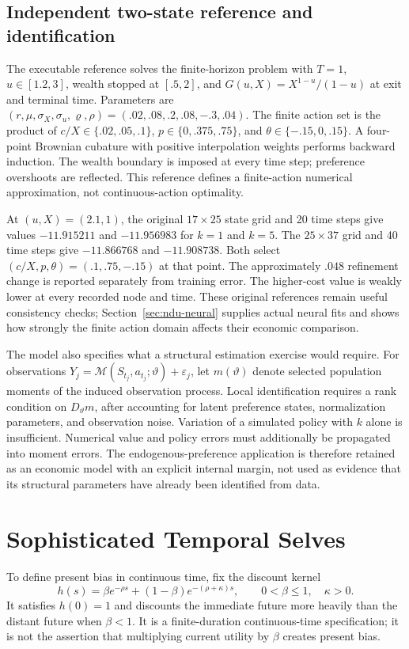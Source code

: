\documentclass[ecta,draft]{econsocart}
\theoremstyle{definition}
\theoremstyle{remark}
\begin{document}
\subsection{Independent two-state reference and identification}
The executable reference solves the finite-horizon problem with $T=1$, $u\in[1.2,3]$, wealth stopped at $[.5,2]$, and $G(u,X)=X^{1-u}/(1-u)$ at exit and terminal time. Parameters are $(r,\mu,\sigma_X,\sigma_u,\varrho,\rho)=(.02,.08,.2,.08,-.3,.04)$. The finite action set is the product of $c/X\in\{.02,.05,.1\}$, $p\in\{0,.375,.75\}$, and $\theta\in\{-.15,0,.15\}$. A four-point Brownian cubature with positive interpolation weights performs backward induction. The wealth boundary is imposed at every time step; preference overshoots are reflected. This reference defines a finite-action numerical approximation, not continuous-action optimality.

At $(u,X)=(2.1,1)$, the original $17\times25$ state grid and 20 time steps give values $-11.915211$ and $-11.956983$ for $k=1$ and $k=5$. The $25\times37$ grid and 40 time steps give $-11.866768$ and $-11.908738$. Both select $(c/X,p,\theta)=(.1,.75,-.15)$ at that point. The approximately $.048$ refinement change is reported separately from training error. The higher-cost value is weakly lower at every recorded node and time. These original references remain useful consistency checks; Section~\ref{sec:ndu-neural} supplies actual neural fits and shows how strongly the finite action domain affects their economic comparison.

The model also specifies what a structural estimation exercise would require. For observations $Y_j=\mathcal M(S_{t_j},a_{t_j};\vartheta)+\varepsilon_j$, let $m(\vartheta)$ denote selected population moments of the induced observation process. Local identification requires a rank condition on $D_\vartheta m$, after accounting for latent preference states, normalization parameters, and observation noise. Variation of a simulated policy with $k$ alone is insufficient. Numerical value and policy errors must additionally be propagated into moment errors. The endogenous-preference application is therefore retained as an economic model with an explicit internal margin, not used as evidence that its structural parameters have already been identified from data.



\section{Sophisticated Temporal Selves}\label{sec:temporal}
To define present bias in continuous time, fix the discount kernel
\begin{equation}\label{eq:kernel}
 h(s)=\beta e^{-\rho s}+(1-\beta)e^{-(\rho+\kappa)s},
 \qquad 0<\beta\leq1,\quad\kappa>0.
\end{equation}
It satisfies $h(0)=1$ and discounts the immediate future more heavily than the distant future when $\beta<1$. It is a finite-duration continuous-time specification; it is not the assertion that multiplying current utility by $\beta$ creates present bias.
\end{document}
